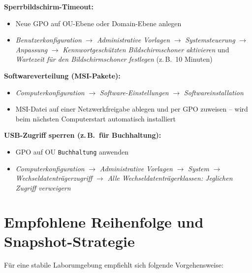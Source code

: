 \documentclass[11pt, oneside, numbers=noenddot]{scrbook}
\begin{document}
\textbf{Sperrbildschirm-Timeout:}
\begin{itemize}
  \item Neue GPO auf OU-Ebene oder Domain-Ebene anlegen
  \item \textit{Benutzerkonfiguration} $\rightarrow$ \textit{Administrative Vorlagen} $\rightarrow$ \textit{Systemsteuerung} $\rightarrow$ \textit{Anpassung} $\rightarrow$ \textit{Kennwortgeschützten Bildschirmschoner aktivieren} und \textit{Wartezeit für den Bildschirmschoner festlegen} (z.\,B.\ 10 Minuten)
\end{itemize}

\textbf{Softwareverteilung (MSI-Pakete):}
\begin{itemize}
  \item \textit{Computerkonfiguration} $\rightarrow$ \textit{Software-Einstellungen} $\rightarrow$ \textit{Softwareinstallation}
  \item MSI-Datei auf einer Netzwerkfreigabe ablegen und per GPO zuweisen -- wird beim nächsten Computerstart automatisch installiert
\end{itemize}

\textbf{USB-Zugriff sperren (z.\,B.\ für Buchhaltung):}
\begin{itemize}
  \item GPO auf OU \texttt{Buchhaltung} anwenden
  \item \textit{Computerkonfiguration} $\rightarrow$ \textit{Administrative Vorlagen} $\rightarrow$ \textit{System} $\rightarrow$ \textit{Wechseldatenträgerzugriff} $\rightarrow$ \textit{Alle Wechseldatenträgerklassen: Jeglichen Zugriff verweigern}
\end{itemize}

\newpage

\section{Empfohlene Reihenfolge und Snapshot-Strategie}

Für eine stabile Laborumgebung empfiehlt sich folgende Vorgehensweise:
\end{document}
